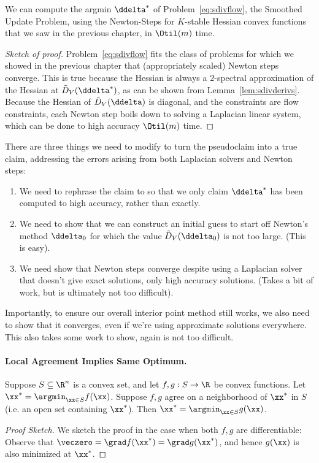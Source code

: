 \begin{pseudoclaim}
  We can compute the argmin $\ddelta^*$ of
  Problem~\eqref{eq:sdivflow}, the Smoothed Update Problem, using the Newton-Steps for
  $K$-stable Hessian convex functions that we saw in the previous chapter, in
  $\Otil(m)$ time.
\end{pseudoclaim}
\begin{proof}[Sketch of proof]
  Problem~\eqref{eq:sdivflow} fits the class of problems for which we
  showed in the previous chapter 
  that (appropriately scaled) Newton steps converge.
  This is true because the Hessian is always a $2$-spectral
  approximation of the Hessian at $\sdiv_V( \ddelta^* )$, as can be
  shown from Lemma~\ref{lem:sdivderivs}.
  Because the Hessian of $\sdiv_V( \ddelta )$ is diagonal, and the
  constraints are flow constraints, each
  Newton step boils down to solving a Laplacian linear system, which can
  be done to high accuracy $\Otil(m)$ time.
\end{proof}

\begin{remark}
  There are three things we need to modify to turn the pseudoclaim
  into a true claim, addressing the errors arising from both Laplacian
  solvers and Newton steps:
  \begin{enumerate}
  \item We need to rephrase the claim to so that we only claim
    $\ddelta^*$ has been computed to high accuracy, rather than exactly.
  \item We need to show that we can construct an initial guess to
    start off Newton's method $\ddelta_0$ for which the value
    $\sdiv_V( \ddelta_0 )$ is not too large. (This is easy).
  \item We need show that Newton steps converge despite using a
    Laplacian solver that doesn't give exact solutions, only high
    accuracy solutions. (Takes a bit of work, but is ultimately not
    too difficult).
  \end{enumerate}
Importantly, to ensure our overall interior point method still works,
  we also need to show that it converges,
even if we're using approximate solutions
everywhere. This also takes some work to show, again is not too difficult.
\end{remark}


\paragraph{Local Agreement Implies Same Optimum.}
\begin{lemma}
  \label{lem:argminsfromlocalagreement}
  Suppose $S \subseteq \R^n$ is a convex set, and let $f, g: S \to \R$ be convex
  functions.
  Let $\xx^* = \argmin_{\xx \in S} f(\xx)$.
  Suppose $f,g$ agree on a neighborhood of $\xx^*$ in $S$ (i.e. an
  open set containing $\xx^*$).
  Then $\xx^* = \argmin_{\xx \in S} g(\xx)$.
\end{lemma}
\begin{proof}[Proof Sketch]
  We sketch the proof in the case when both $f,g$ are differentiable: Observe
  that $\veczero = \grad f(\xx^*) = \grad g(\xx^*)$, and hence $g(\xx)$
  is also minimized at $\xx^*$.
\end{proof}

